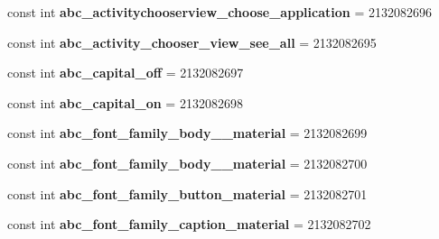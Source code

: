 \begin{DoxyCompactItemize}
\mbox{\label{classst_delivery_1_1_resource_1_1_string_a047f1bf2b41cfafe116f3e0416c87129}} 
const int {\bfseries abc\+\_\+activitychooserview\+\_\+choose\+\_\+application} = 2132082696
\item 
\mbox{\label{classst_delivery_1_1_resource_1_1_string_a4cf6fabde063b7ae71dbdaec4c70a55b}} 
const int {\bfseries abc\+\_\+activity\+\_\+chooser\+\_\+view\+\_\+see\+\_\+all} = 2132082695
\item 
\mbox{\label{classst_delivery_1_1_resource_1_1_string_ad386ba15cbc425acb0e967324746c64f}} 
const int {\bfseries abc\+\_\+capital\+\_\+off} = 2132082697
\item 
\mbox{\label{classst_delivery_1_1_resource_1_1_string_af005aef2bd4f4837a0bc8214419ee1ea}} 
const int {\bfseries abc\+\_\+capital\+\_\+on} = 2132082698
\item 
\mbox{\label{classst_delivery_1_1_resource_1_1_string_ad98753db58ff12db1c56be6203db7946}} 
const int {\bfseries abc\+\_\+font\+\_\+family\+\_\+body\+\_\+\_\+material} = 2132082699
\item 
\mbox{\label{classst_delivery_1_1_resource_1_1_string_a4cd29c67e3cbc0f806e18da08ac2fd18}} 
const int {\bfseries abc\+\_\+font\+\_\+family\+\_\+body\+\_\+\_\+material} = 2132082700
\item 
\mbox{\label{classst_delivery_1_1_resource_1_1_string_a292aa85aa6544e46d3ee16b42a602da9}} 
const int {\bfseries abc\+\_\+font\+\_\+family\+\_\+button\+\_\+material} = 2132082701
\item 
\mbox{\label{classst_delivery_1_1_resource_1_1_string_a898eacee017ca63d916a717f78f7c113}} 
const int {\bfseries abc\+\_\+font\+\_\+family\+\_\+caption\+\_\+material} = 2132082702
\item 
\mbox{\label{classst_delivery_1_1_resource_1_1_string_ae2f4a06360989ec19e23015108f9c346}} 

\end{DoxyCompactItemize}
